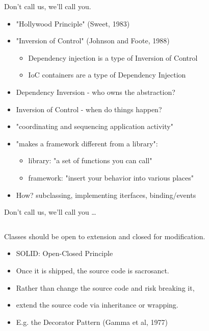 \documentclass{beamer}
\begin{document}
\begin{frame}{Don't call us, we'll call you.}
    \begin{itemize}
        \item "Hollywood Principle" (Sweet, 1983)
        \item "Inversion of Control" (Johnson and Foote, 1988)
            \begin{itemize}
                \item Dependency injection is a type of Inversion of Control
                \item IoC containers are a type of Dependency Injection
            \end{itemize}
        \item Dependency Inversion - who owns the abstraction?
        \item Inversion of Control - when do things happen?
        \item "coordinating and sequencing application activity"         
        \item "makes a framework different from a library":
            \begin{itemize}
                \item library: "a set of functions you can call"
                \item framework: "insert your behavior into various places"
            \end{itemize}
        \item How? subclassing, implementing iterfaces, binding/events
    \end{itemize}
\end{frame}

\begin{frame}{Don't call us, we'll call you \ldots}
    \vspace{0cm}
    \begin{columns}
        \column{\dimexpr\paperwidth-40pt}
        
    \end{columns}
\end{frame}

\begin{frame}{Classes should be open to extension and closed for modification.}
    \begin{itemize}
        \item SOLID: Open-Closed Principle
        \item Once it is shipped, the source code is sacrosanct.
        \item Rather than change the source code and risk breaking it, 
        \item extend the source code via inheritance or wrapping. 
        \item E.g. the Decorator Pattern (Gamma et al, 1977)
    \end{itemize}
\end{frame}
\end{document}
